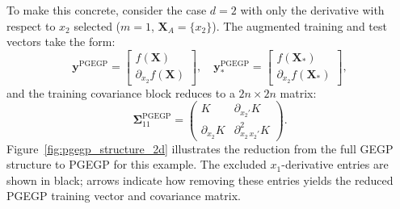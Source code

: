\documentclass[12pt]{article}
\begin{document}
To make this concrete, consider the case $d = 2$ with only the derivative with respect to $x_2$ selected ($m = 1$, $\mathbf{X}_A = \{x_2\}$). The augmented training and test vectors take the form:
\begin{equation}
	\label{eqn:pgegp_aug_vectors_2d}
	\mathbf{y}^{\text{PGEGP}} = \begin{bmatrix} f(\mathbf{X}) \\ \partial_{x_2} f(\mathbf{X}) \end{bmatrix}, \quad
	\mathbf{y}^{\text{PGEGP}}_* = \begin{bmatrix} f(\mathbf{X}_*) \\ \partial_{x_2} f(\mathbf{X}_*) \end{bmatrix},
\end{equation}
and the training covariance block reduces to a $2n \times 2n$ matrix:
\begin{equation}
	\label{eqn:pgegp_S11_2d}
	\boldsymbol{\Sigma}^{\text{PGEGP}}_{11} =
	\begin{pmatrix}
		K & \partial_{x_2'} K \\[8pt]
		\partial_{x_2} K & \partial^2_{x_2\,x_2'} K
	\end{pmatrix}.
\end{equation}
Figure~\ref{fig:pgegp_structure_2d} illustrates the reduction from the full GEGP structure to PGEGP for this example. The excluded $x_1$-derivative entries are shown in black; arrows indicate how removing these entries yields the reduced PGEGP training vector and covariance matrix.
\end{document}
